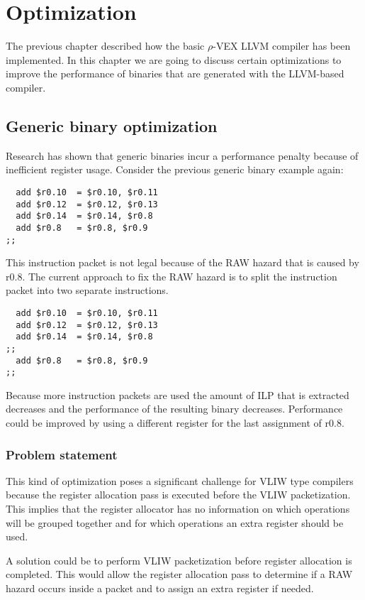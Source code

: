 \chapter{Optimization}
\label{chap:optimization}
The previous chapter described how the basic $\rho$-VEX LLVM compiler has been implemented. In this chapter we are going to discuss certain optimizations to improve the performance of binaries that are generated with the LLVM-based compiler.

\section{Generic binary optimization}
Research has shown \cite{Anthony-Brandon:2013jk} that generic binaries incur a performance penalty because of inefficient register usage. Consider the previous generic binary example again:

\begin{lstlisting}
  add $r0.10  = $r0.10, $r0.11
  add $r0.12  = $r0.12, $r0.13
  add $r0.14  = $r0.14, $r0.8
  add $r0.8   = $r0.8, $r0.9
;;
\end{lstlisting}

This instruction packet is not legal because of the RAW hazard that is caused by r0.8. The current approach to fix the RAW hazard is to split the instruction packet into two separate instructions. 

\begin{lstlisting}
  add $r0.10  = $r0.10, $r0.11
  add $r0.12  = $r0.12, $r0.13
  add $r0.14  = $r0.14, $r0.8
;;
  add $r0.8   = $r0.8, $r0.9
;;
\end{lstlisting}

Because more instruction packets are used the amount of ILP that is extracted decreases and the performance of the resulting binary decreases. Performance could be improved by using a different register for the last assignment of r0.8. 

\subsection{Problem statement}
This kind of optimization poses a significant challenge for VLIW type compilers because the register allocation pass is executed before the VLIW packetization. This implies that the register allocator has no information on which operations will be grouped together and for which operations an extra register should be used.

A solution could be to perform VLIW packetization before register allocation is completed. This would allow the register allocation pass to determine if a RAW hazard occurs inside a packet and to assign an extra register if needed.

